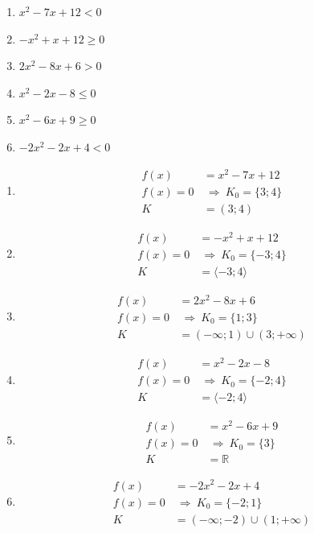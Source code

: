 \documentclass[11pt,a4paper]{article}
\begin{document}
\begin{zadaniReseniBox}[title={Domácí úkol}]
\begin{enumerate}[label=\alph*),itemsep=2pt]
\item $x^{2} - 7x + 12<0$
\item $- x^{2} + x + 12\ge0$
\item $2x^{2} - 8x + 6>0$
\item $x^{2} - 2x - 8\le0$
\item $x^{2} - 6x + 9\ge0$
\item $- 2x^{2} - 2x + 4<0$
\end{enumerate}
\tcblower
\begin{enumerate}[label=\alph*),itemsep=2pt]
\item
\[\begin{aligned}
f(x)&=x^{2} - 7x + 12\\[2pt]
f(x)=0&\ \Rightarrow\ K_0=\{3;4\}\\[2pt]
K&=(3;4)
\end{aligned}\]
\item
\[\begin{aligned}
f(x)&=- x^{2} + x + 12\\[2pt]
f(x)=0&\ \Rightarrow\ K_0=\{-3;4\}\\[2pt]
K&=\langle-3;4\rangle
\end{aligned}\]
\item
\[\begin{aligned}
f(x)&=2x^{2} - 8x + 6\\[2pt]
f(x)=0&\ \Rightarrow\ K_0=\{1;3\}\\[2pt]
K&=(-\infty;1)\cup(3;+\infty)
\end{aligned}\]
\item
\[\begin{aligned}
f(x)&=x^{2} - 2x - 8\\[2pt]
f(x)=0&\ \Rightarrow\ K_0=\{-2;4\}\\[2pt]
K&=\langle-2;4\rangle
\end{aligned}\]
\item
\[\begin{aligned}
f(x)&=x^{2} - 6x + 9\\[2pt]
f(x)=0&\ \Rightarrow\ K_0=\{3\}\\[2pt]
K&=\mathbb R
\end{aligned}\]
\item
\[\begin{aligned}
f(x)&=- 2x^{2} - 2x + 4\\[2pt]
f(x)=0&\ \Rightarrow\ K_0=\{-2;1\}\\[2pt]
K&=(-\infty;-2)\cup(1;+\infty)
\end{aligned}\]
\end{enumerate}
\end{zadaniReseniBox}
\end{document}
